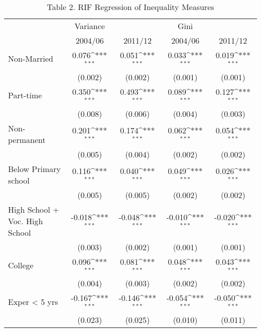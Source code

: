 \begin{table}[htbp]\centering
\def\sym#1{\ifmmode^{#1}\else\(^{#1}\)\fi}
\caption{Table 2. RIF Regression of Inequality Measures}
\begin{tabular}{l*{4}{c}}
\hline\hline
                    &    Variance         &                     &        Gini         &                     \\
                    &\multicolumn{1}{c}{2004/06}&\multicolumn{1}{c}{2011/12}&\multicolumn{1}{c}{2004/06}&\multicolumn{1}{c}{2011/12}\\
\hline
Non-Married         &       0.076\sym{***}&       0.051\sym{***}&       0.033\sym{***}&       0.019\sym{***}\\
                    &     (0.002)         &     (0.002)         &     (0.001)         &     (0.001)         \\
Part-time           &       0.350\sym{***}&       0.493\sym{***}&       0.089\sym{***}&       0.127\sym{***}\\
                    &     (0.008)         &     (0.006)         &     (0.004)         &     (0.003)         \\
Non-permanent       &       0.201\sym{***}&       0.174\sym{***}&       0.062\sym{***}&       0.054\sym{***}\\
                    &     (0.005)         &     (0.004)         &     (0.002)         &     (0.002)         \\
Below Primary school&       0.116\sym{***}&       0.040\sym{***}&       0.049\sym{***}&       0.026\sym{***}\\
                    &     (0.005)         &     (0.005)         &     (0.002)         &     (0.002)         \\
High School + Voc. High School&      -0.018\sym{***}&      -0.048\sym{***}&      -0.010\sym{***}&      -0.020\sym{***}\\
                    &     (0.003)         &     (0.002)         &     (0.001)         &     (0.001)         \\
College             &       0.096\sym{***}&       0.081\sym{***}&       0.048\sym{***}&       0.043\sym{***}\\
                    &     (0.004)         &     (0.003)         &     (0.002)         &     (0.002)         \\
Exper < 5 yrs       &      -0.167\sym{***}&      -0.146\sym{***}&      -0.054\sym{***}&      -0.050\sym{***}\\
                    &     (0.023)         &     (0.025)         &     (0.010)         &     (0.011)         \\

\end{tabular}
\end{table}
